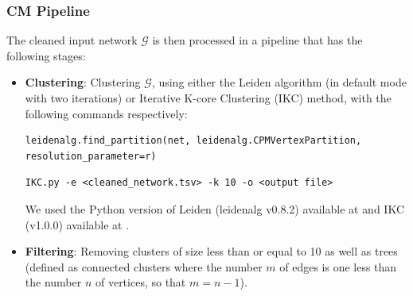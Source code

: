 \documentclass[a4paper]{article}   	%
\begin{document}
\subsubsection*{CM Pipeline}
The cleaned input network $\mathcal{G}$ is then processed in a pipeline that has the following stages:
\begin{itemize}
\item \textbf{Clustering}: Clustering $\mathcal{G}$, using either the Leiden algorithm (in default mode with two iterations) or Iterative K-core Clustering (IKC) method, with the following commands respectively:

\begin{lstlisting}[basicstyle=\ttfamily\small]
leidenalg.find_partition(net, leidenalg.CPMVertexPartition, resolution_parameter=r)
\end{lstlisting}

\begin{lstlisting}[basicstyle=\ttfamily\small]
IKC.py -e <cleaned_network.tsv> -k 10 -o <output file>
\end{lstlisting}

We used the Python version of Leiden (leidenalg v0.8.2) available at \cite{leiden-code} and
IKC (v1.0.0) available at \cite{ikc-code}.



\item  \textbf{Filtering}: Removing clusters of size less than or equal to 10 as well as trees (defined as connected clusters where the number $m$ of edges is one less than the number $n$ of vertices, so that $m=n-1$).


\end{itemize}
\end{document}

